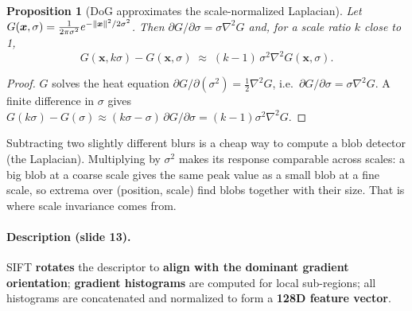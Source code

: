 \documentclass[11pt,a4paper]{article}
\theoremstyle{definition}
\theoremstyle{plain}
\newtheorem{proposition}[definition]{Proposition}
\theoremstyle{remark}
\begin{document}
\begin{proposition}[DoG approximates the scale-normalized Laplacian]\label{prop:dog}
Let $G(\bm x,\sigma)=\frac1{2\pi\sigma^2}e^{-\lVert \bm x\rVert^2/2\sigma^2}$. Then $\partial G/\partial\sigma=\sigma\nabla^2G$ and,
for a scale ratio $k$ close to 1,
\[
G(\bm x,k\sigma)-G(\bm x,\sigma)\;\approx\;(k-1)\,\sigma^2\nabla^2G(\bm x,\sigma).
\]
\end{proposition}
\begin{proof}
$G$ solves the heat equation $\partial G/\partial(\sigma^2)=\tfrac12\nabla^2G$, i.e.\ $\partial G/\partial\sigma=\sigma\nabla^2G$.
A finite difference in $\sigma$ gives $G(k\sigma)-G(\sigma)\approx(k\sigma-\sigma)\,\partial G/\partial\sigma=(k-1)\sigma^2\nabla^2G$.
\end{proof}

\begin{intuition}
Subtracting two slightly different blurs is a cheap way to compute a blob detector (the Laplacian). Multiplying by $\sigma^2$ makes
its response comparable across scales: a big blob at a coarse scale gives the same peak value as a small blob at a fine
scale, so extrema over (position, scale) find blobs together with their size. That is where scale invariance comes from.
\end{intuition}

\paragraph{Description (slide 13).}
SIFT \textbf{rotates} the descriptor to \textbf{align with the dominant gradient orientation}; \textbf{gradient histograms} are computed
for local sub-regions; all histograms are concatenated and normalized to form a \textbf{128D feature vector}.
\end{document}
